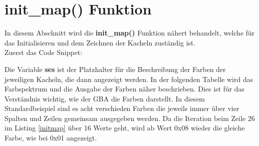 \section{init\_map() Funktion}
In diesem Abschnitt wird die \textbf{init\_map()} Funktion nähert behandelt, welche für das Initialisieren und dem Zeichnen der Kacheln zuständig ist. \citep{tonc} \\
Zuerst das Code Snippet:



Die Variable \textbf{ses} ist der Platzhalter für die Beschreibung der Farben der jeweiligen Kacheln, die dann angezeigt werden. In der folgenden Tabelle wird das Farbspektrum und die Ausgabe der Farben näher beschrieben. Dies ist für das Verständnis wichtig, wie der \acs{GBA} die Farben darstellt. In diesem Standardbeispiel sind es acht verschieden Farben die jeweils immer über vier Spalten und Zeilen gemeinsam ausgegeben werden. Da die Iteration beim Zeile 26 im Listing \ref{initmap} über 16 Werte geht, wird ab Wert 0x08 wieder die gleiche Farbe, wie bei 0x01 angezeigt.

